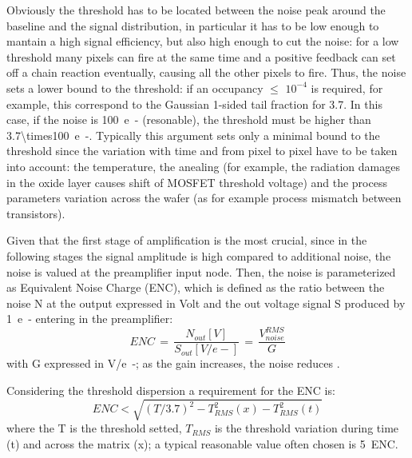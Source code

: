        Obviously the threshold has to be located between the noise peak around the baseline and the signal distribution, in particular it has to be low enough to mantain a high signal efficiency, but also high enough to cut the noise: for a low threshold many pixels can fire at the same time and a positive feedback can set off a chain reaction eventually, causing all the other pixels to fire.
        Thus, the noise sets a lower bound to the threshold: if an occupancy $\leqslant$ $10^{-4}$ is required, for example, this correspond to the Gaussian 1-sided tail fraction for \SI{3.7}{\sigma}.
        In this case, if the noise is \SI{100}{e-} (resonable), the threshold must be higher than \SI[parse-numbers=false]{3.7\times100}{e-}.
        Typically this argument sets only a minimal bound to the threshold since the variation with time and from pixel to pixel have to be taken into account: the temperature, the anealing (for example, the radiation damages in the oxide layer causes shift of MOSFET threshold voltage) and the process parameters variation across the wafer (as for example process mismatch between transistors). 

        
        Given that the first stage of amplification is the most crucial, since in the following stages the signal amplitude is high compared to additional noise, the noise is valued at the preamplifier input node.
        Then, the noise is parameterized as Equivalent Noise Charge (ENC), which is defined as the ratio between the noise N at the output expressed in Volt and the out voltage signal S produced by \SI{1}{e-} entering in the preamplifier:
        \begin{equation}
            ENC\, =\, \frac{N_{out}[V]}{S_{out}[V/e-]}\,=\,\frac{V^{RMS} _{noise}}{G}
        \end{equation} 
        with G expressed in \si{V/e-}; as the gain increases, the noise reduces . 

        Considering the threshold dispersion a requirement for the ENC is: 
        \begin{equation}
            ENC < \sqrt{(T/3.7)^2 - T_{RMS} ^2 (x) - T_{RMS} ^2 (t)}
        \end{equation}
        where the T is the threshold setted, $T_{RMS}$ is the threshold variation during time (t) and across the matrix (x); a typical reasonable value often chosen is \SI{5}{ENC}.

